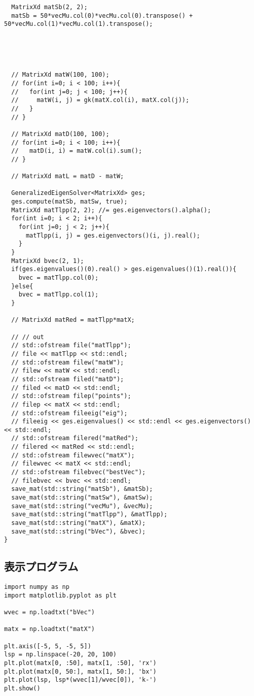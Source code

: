 \documentclass[9pt]{ltjsarticle}
\begin{document}
\begin{verbatim}
  MatrixXd matSb(2, 2);
  matSb = 50*vecMu.col(0)*vecMu.col(0).transpose() + 50*vecMu.col(1)*vecMu.col(1).transpose();





  // MatrixXd matW(100, 100);
  // for(int i=0; i < 100; i++){
  //   for(int j=0; j < 100; j++){
  //     matW(i, j) = gk(matX.col(i), matX.col(j));
  //   }
  // }

  // MatrixXd matD(100, 100);
  // for(int i=0; i < 100; i++){
  //   matD(i, i) = matW.col(i).sum();
  // }

  // MatrixXd matL = matD - matW;

  GeneralizedEigenSolver<MatrixXd> ges;
  ges.compute(matSb, matSw, true);
  MatrixXd matTlpp(2, 2); //= ges.eigenvectors().alpha();
  for(int i=0; i < 2; i++){
    for(int j=0; j < 2; j++){
      matTlpp(i, j) = ges.eigenvectors()(i, j).real();
    }
  }
  MatrixXd bvec(2, 1);
  if(ges.eigenvalues()(0).real() > ges.eigenvalues()(1).real()){
    bvec = matTlpp.col(0);
  }else{
    bvec = matTlpp.col(1);
  }

  // MatrixXd matRed = matTlpp*matX;

  // // out
  // std::ofstream file("matTlpp");
  // file << matTlpp << std::endl;
  // std::ofstream filew("matW");
  // filew << matW << std::endl;
  // std::ofstream filed("matD");
  // filed << matD << std::endl;
  // std::ofstream filep("points");
  // filep << matX << std::endl;
  // std::ofstream fileeig("eig");
  // fileeig << ges.eigenvalues() << std::endl << ges.eigenvectors() << std::endl;
  // std::ofstream filered("matRed");
  // filered << matRed << std::endl;
  // std::ofstream filewvec("matX");
  // filewvec << matX << std::endl;
  // std::ofstream filebvec("bestVec");
  // filebvec << bvec << std::endl;
  save_mat(std::string("matSb"), &matSb);
  save_mat(std::string("matSw"), &matSw);
  save_mat(std::string("vecMu"), &vecMu);
  save_mat(std::string("matTlpp"), &matTlpp);
  save_mat(std::string("matX"), &matX);
  save_mat(std::string("bVec"), &bvec);
}
\end{verbatim}
\normalsize
\subsection*{表示プログラム}
\tiny
\begin{verbatim}
import numpy as np
import matplotlib.pyplot as plt

wvec = np.loadtxt("bVec")

matx = np.loadtxt("matX")

plt.axis([-5, 5, -5, 5])
lsp = np.linspace(-20, 20, 100)
plt.plot(matx[0, :50], matx[1, :50], 'rx')    
plt.plot(matx[0, 50:], matx[1, 50:], 'bx')    
plt.plot(lsp, lsp*(wvec[1]/wvec[0]), 'k-')  
plt.show()
\end{verbatim}

\normalsize
\end{document}
